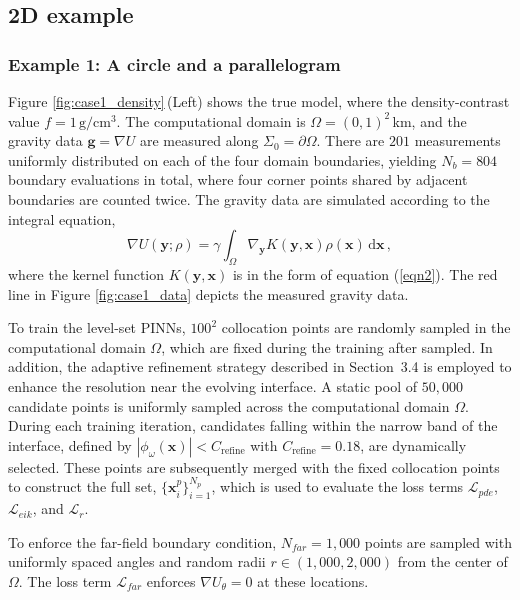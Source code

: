 \documentclass[final,hidelinks,onefignum,onetabnum]{siamart251216}
\begin{document}
\subsection{2D example}


\subsubsection{Example 1: A circle and a parallelogram}

Figure \ref{fig:case1_density}\,(Left) shows the true model, where the density-contrast value $f=1\,\mathrm{g}/\mathrm{cm}^3$. The computational domain is $\Omega = (0, 1)^2$\,km, and the gravity data $\mathbf{g}=\nabla U$ are measured along $\Sigma_0=\partial\Omega$. There are $201$ measurements uniformly distributed on each of the four domain boundaries, yielding $N_b = 804$ boundary evaluations in total, where four corner points shared by adjacent boundaries are counted twice. The gravity data are simulated according to the integral equation,
\begin{equation}\label{data_simulation}
\nabla U(\mathbf{y};\rho)=\gamma\int_\Omega \nabla_{\mathbf{y}}K(\mathbf{y},\mathbf{x})\rho(\mathbf{x})\,\mathrm{d}\mathbf{x}\,,
\end{equation}
where the kernel function $K(\mathbf{y},\mathbf{x})$ is in the form of equation (\ref{eqn2}). The red line in Figure \ref{fig:case1_data} depicts the measured gravity data.

To train the level-set PINNs, $100^2$ collocation points are randomly sampled in the computational domain $\Omega$, which are fixed during the training after sampled. In addition, the adaptive refinement strategy described in Section~3.4 is employed to enhance the resolution near the evolving interface. A static pool of $50{,}000$ candidate points is uniformly sampled across the computational domain $\Omega$. During each training iteration, candidates falling within the narrow band of the interface, defined by $|\phi_\omega(\mathbf{x})| < C_{\mathrm{refine}}$ with $C_{\mathrm{refine}} = 0.18$, are dynamically selected. These points are subsequently merged with the fixed collocation points to construct the full set, $\big\{\mathbf{x}_i^p\big\}_{i=1}^{N_p}$, which is used to evaluate the loss terms $\mathcal{L}_{pde}$, $\mathcal{L}_{eik}$, and $\mathcal{L}_r$.

To enforce the far-field boundary condition, $N_{far} = 1{,}000$ points are sampled with uniformly spaced angles and random radii $r \in (1{,}000, 2{,}000)$ from the center of $\Omega$. The loss term $\mathcal{L}_{far}$ enforces $\nabla U_\theta = 0$ at these locations.
\end{document}
